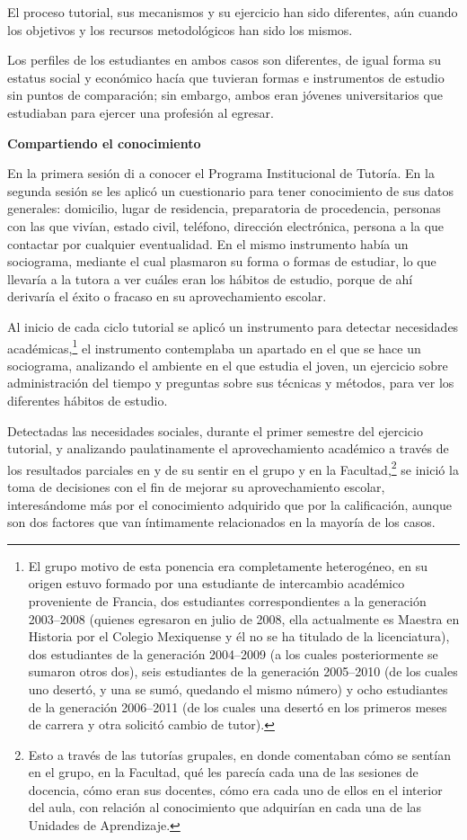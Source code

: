 El proceso tutorial, sus mecanismos y su ejercicio han sido diferentes, aún
cuando los objetivos y los recursos metodológicos han sido los mismos.


Los perfiles de los estudiantes en ambos casos son diferentes, de igual
forma su estatus social y económico hacía que tuvieran formas e
instrumentos de estudio sin puntos de comparación; sin embargo, ambos eran
jóvenes universitarios que estudiaban para ejercer una profesión al
egresar.


\bigskip
\textbf{Compartiendo el conocimiento}

\enlargethispage{1\baselineskip}
En la primera sesión di a conocer el Programa Institucional de Tutoría. En la
segunda sesión se les aplicó un cuestionario para tener conocimiento
de sus datos generales: domicilio, lugar de residencia, preparatoria de
procedencia, personas con las que vivían, estado civil, teléfono, dirección
electrónica, persona a la que contactar por cualquier eventualidad. En el
mismo instrumento había un sociograma, mediante el cual plasmaron su forma o
formas de estudiar, lo que llevaría a la tutora a ver cuáles eran los
hábitos de estudio, porque de ahí derivaría el éxito o fracaso en su
aprovechamiento escolar.


Al inicio de cada ciclo tutorial se aplicó un instrumento para detectar
necesidades académicas,\footnote{El grupo motivo de esta ponencia era
completamente heterogéneo, en su origen estuvo formado por una estudiante
de intercambio académico proveniente de Francia, dos estudiantes
correspondientes a la generación 2003--2008 (quienes egresaron  en julio
de 2008, ella actualmente es Maestra en Historia por el Colegio Mexiquense y
él no se ha titulado de la licenciatura), dos estudiantes de la generación
2004--2009 (a los cuales posteriormente se sumaron otros dos), seis estudiantes
de la generación 2005--2010 (de los cuales uno desertó, y una se sumó,
quedando el mismo número) y ocho estudiantes de la generación 2006--2011 (de
los cuales una desertó en los primeros meses de carrera y otra solicitó
cambio de tutor).} el instrumento contemplaba un apartado en el que se hace
un sociograma, analizando el ambiente en el que estudia el joven, un
ejercicio sobre administración del tiempo y preguntas sobre sus técnicas  y
métodos, para ver los diferentes hábitos de estudio.


Detectadas las necesidades sociales, durante el primer semestre del
ejercicio tutorial, y analizando paulatinamente el aprovechamiento
académico a través de los resultados parciales en y de su sentir en el
grupo y en la Facultad,\footnote{Esto a través de las tutorías grupales, en
donde comentaban cómo se sentían en el grupo, en la Facultad, qué les
parecía cada una de las sesiones de docencia, cómo eran sus docentes, cómo
era cada uno de ellos en el interior del aula, con relación al conocimiento
que adquirían en cada una de las Unidades de Aprendizaje.} se inició la toma
de decisiones con el fin de mejorar su aprovechamiento escolar,
interesándome más por el conocimiento adquirido que por la calificación,
aunque son dos factores que van íntimamente relacionados en la mayoría de
los casos.



